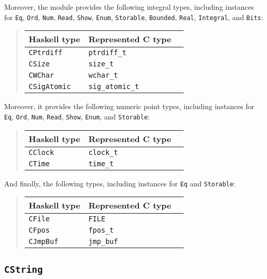 \documentclass[a4paper,twosides]{article}
\newcommand{\code}[1]{\texttt{#1}}      %
\begin{document}
Moreover, the module provides the following integral types, including
instances for \code{Eq}, \code{Ord}, \code{Num}, \code{Read}, \code{Show},
\code{Enum}, \code{Storable}, \code{Bounded}, \code{Real}, \code{Integral},
and \code{Bits}:
%
\begin{quote}
  \begin{tabular}{|l|l|l|}
    \hline
    Haskell type     & Represented C type\\\hline\hline
    \code{CPtrdiff}  & \code{ptrdiff\_t}\\\hline
    \code{CSize}     & \code{size\_t}\\\hline
    \code{CWChar}    & \code{wchar\_t}\\\hline
    \code{CSigAtomic}& \code{sig\_atomic\_t}\\\hline
  \end{tabular}
\end{quote}
%
Moreover, it provides the following numeric point types, including instances
for \code{Eq}, \code{Ord}, \code{Num}, \code{Read}, \code{Show}, \code{Enum},
and \code{Storable}:
%
\begin{quote}
  \begin{tabular}{|l|l|l|}
    \hline
    Haskell type     & Represented C type\\\hline\hline
    \code{CClock}    & \code{clock\_t}\\\hline
    \code{CTime}     & \code{time\_t}\\\hline
  \end{tabular}
\end{quote}
%
And finally, the following types, including instances for \code{Eq} and
\code{Storable}:
%
\begin{quote}
  \begin{tabular}{|l|l|l|}
    \hline
    Haskell type     & Represented C type\\\hline\hline
    \code{CFile}     & \code{FILE}\\\hline
    \code{CFpos}     & \code{fpos\_t}\\\hline
    \code{CJmpBuf}   & \code{jmp\_buf}\\\hline
  \end{tabular}
\end{quote}

\subsection{\code{CString}}
\label{sec:CString}
\end{document}
